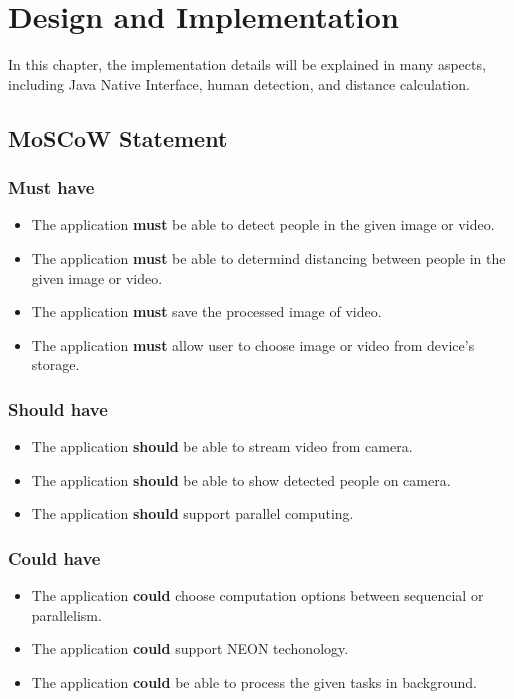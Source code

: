 \chapter{Design and Implementation}\label{implement}

    In this chapter, the implementation details will be explained in many aspects, including Java Native Interface,
    human detection, and distance calculation.

    \section{MoSCoW Statement}

        \subsection{Must have}
            \begin{itemize}
                \setlength\itemsep{1em}
                \item The application \textbf{must} be able to detect people in the given image or video.
                \item The application \textbf{must} be able to determind distancing between people in the given image or video.
                \item The application \textbf{must} save the processed image of video.
                \item The application \textbf{must} allow user to choose image or video from device's storage.
            \end{itemize}

        \subsection{Should have}
            \begin{itemize}
                \item The application \textbf{should} be able to stream video from camera.
                \item The application \textbf{should} be able to show detected people on camera.
                \item The application \textbf{should} support parallel computing.
            \end{itemize}

        \subsection{Could have}
            \begin{itemize}
                \item The application \textbf{could} choose computation options between sequencial or parallelism.
                \item The application \textbf{could} support NEON techonology.
                \item The application \textbf{could} be able to process the given tasks in background.
            \end{itemize}
